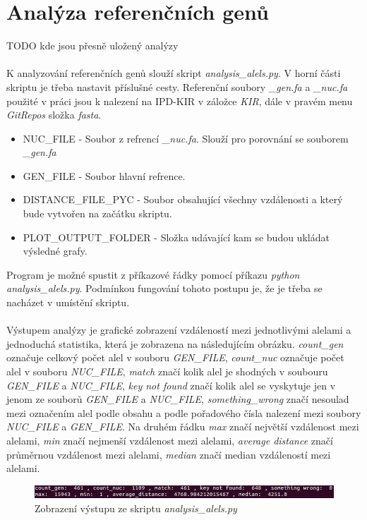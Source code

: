\documentclass[czech,DP]{thesiskiv}
\numberwithin{equation}{section}
\begin{document}
\section{Analýza referenčních genů}
TODO kde jsou přesně uložený analýzy
\\
\\
K analyzování referenčních genů slouží skript \textit{analysis\_alels.py}. V horní části skriptu je třeba nastavit příslušné cesty. Referenční soubory \textit{\_gen.fa} a \textit{\_nuc.fa} použité v práci jsou k nalezení na IPD-KIR \cite{imgt_hla_database} v záložce \textit{KIR}, dále v pravém menu \textit{GitRepos} složka \textit{fasta}.

\begin{itemize}
	\item NUC\_FILE - Soubor z refrencí \textit{\_nuc.fa}. Slouží pro porovnání se souborem \textit{\_gen.fa}
	\item GEN\_FILE - Soubor hlavní refrence.
	\item DISTANCE\_FILE\_PYC - Soubor obsahující všechny vzdálenosti a který bude vytvořen na začátku skriptu.
	\item PLOT\_OUTPUT\_FOLDER - Složka udávající kam se budou ukládat výsledné grafy.
\end{itemize}

\noindent
Program je možné spustit z příkazové řádky pomocí příkazu \textit {python analysis\_alels.py}. Podmínkou fungování tohoto postupu je, že je třeba se nacházet v umístění skriptu. 
\\
\\
\noindent
Výstupem analýzy je grafické zobrazení vzdáleností mezi jednotlivými alelami a jednoduchá statistika, která je zobrazena na následujícím obrázku. \textit{count\_gen} označuje celkový počet alel v souboru \textit{GEN\_FILE}, \textit{count\_nuc} označuje počet alel v souboru \textit{NUC\_FILE}, \textit{match} značí kolik alel je shodných v soubouru \textit{GEN\_FILE} a \textit{NUC\_FILE}, \textit{key not found} značí kolik alel se vyskytuje jen v jenom ze souborů \textit{GEN\_FILE} a \textit{NUC\_FILE}, \textit{something\_wrong} značí nesoulad mezi označením alel podle obsahu a podle pořadového čísla nalezení mezi soubory \textit{NUC\_FILE} a \textit{GEN\_FILE}. Na druhém řádku \textit{max} značí největší vzdálenost mezi alelami, \textit{min} značí nejmenší vzdálenost mezi alelami, \textit{average distance} značí průměrnou vzdálenost mezi alelami, \textit{median} značí median vzdáleností mezi alelami.

\begin{figure}[H]		
		\centering
		\includegraphics[width=\textwidth]{./img/vystup_analyzy_refrence.png}
		\caption{Zobrazení výstupu ze skriptu \textit{analysis\_alels.py} }
		\label{fig:alels_distance_skript}
\end{figure}
\end{document}
